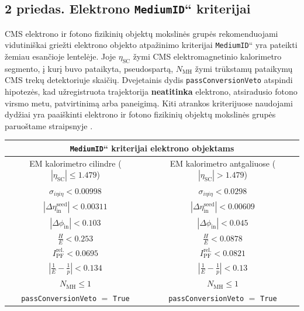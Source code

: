 \documentclass[a4paper, 12pt, oneside]{article}
\newcommand{\ttt}[1]{\texttt{#1}}
\newcommand{\ltq}[1]{{\quotedblbase{}#1\textquotedblleft{}}}
\newlength\q
\begin{document}
\subsection*{2 priedas. Elektrono \ltq{\ttt{MediumID}} kriterijai}
CMS elektrono ir fotono fizikinių objektų mokslinės grupės rekomenduojami vidutiniškai griežti elektrono objekto atpažinimo
kriterijai \ltq{\ttt{MediumID}} yra pateikti žemiau esančioje lentelėje.
Joje $\eta_{\mathrm{SC}}$ žymi CMS elektromagnetinio kalorimetro segmento, į kurį buvo pataikyta, pseudospartą,
$N_{\mathrm{MH}}$ žymi trūkstamų pataikymų CMS trekų detektoriuje skaičių.
Dvejetainis dydis \ttt{passConversionVeto} atspindi hipotezės, kad užregistruota trajektorija \textbf{neatitinka} elektrono,
atsiradusio fotono virsmo metu, patvirtinimą arba paneigimą.
Kiti atrankos kriterijuose naudojami dydžiai yra paaiškinti elektrono ir fotono fizikinių objektų mokslinės grupės paruoštame
straipsnyje \cite{EleID}.
\begin{table}[H]
	\begin{tabular}{|c|c|}
		\hline
		\multicolumn{2}{|c|}{\ltq{\ttt{MediumID}} kriterijai elektrono objektams} \\
		\hline
		\multirow{2}{15em}{\centering EM kalorimetro cilindre ($|\eta_{\mathrm{SC}}| \leqslant 1.479$)} &
			\multirow{2}{15em}{\centering EM kalorimetro antgaliuose ($|\eta_{\mathrm{SC}}| > 1.479$)} \\
		 & \\
		\hline
		$\sigma_{i\eta i\eta}<0.00998$ & $\sigma_{i\eta i\eta}<0.0298$ \\
		$|\Delta\eta_{\mathrm{in}}^{\mathrm{seed}}|<0.00311$ & $|\Delta\eta_{\mathrm{in}}^{\mathrm{seed}}|<0.00609$ \\
		$|\Delta\phi_{\mathrm{in}}|<0.103$ & $|\Delta\phi_{\mathrm{in}}|<0.045$ \\
		\multirow{2}{15em}{\centering$\displaystyle\frac{H}{E}<0.253$} &
			\multirow{2}{15em}{\centering$\displaystyle\frac{H}{E}<0.0878$} \\
		 & \\
		$I_{\mathrm{PF}}^{\mathrm{rel.}}<0.0695$ & $I_{\mathrm{PF}}^{\mathrm{rel.}}<0.0821$ \\
		\multirow{2}{15em}{\centering$\displaystyle \left| \frac{1}{E} - \frac{1}{p} \right|<0.134$} &
			\multirow{2}{15em}{\centering$\displaystyle \left| \frac{1}{E} - \frac{1}{p} \right|<0.13$} \\
		 & \\
		$N_{\mathrm{MH}}\leqslant1$ & $N_{\mathrm{MH}}\leqslant1$ \\
		\ttt{passConversionVeto} $=$ \ttt{True} & \ttt{passConversionVeto} $=$ \ttt{True} \\
		\hline
	\end{tabular}
\end{table}
\end{document}
